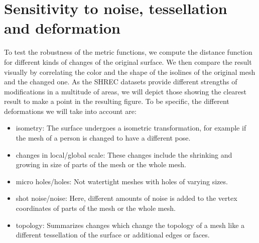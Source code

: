 \section{Sensitivity to noise, tessellation and deformation}
To test the robustness of the metric functions, we compute the distance function for different kinds of changes of the original surface.
We then compare the result visually by correlating the color and the shape of the isolines of the original mesh and the changed one.
As the SHREC datasets provide different strengths of modifications in a multitude of areas, we will depict those showing the clearest result to make a point in the resulting figure.
To be specific, the different deformations we will take into account are:
\begin{itemize}
	\item isometry: The surface undergoes a isometric transformation, for example if the mesh of a person is changed to have a different pose.
	\item changes in local/global scale: These changes include the shrinking and growing in size of parts of the mesh or the whole mesh.
	\item micro holes/holes: Not watertight meshes with holes of varying sizes.
	\item shot noise/noise: Here, different amounts of noise is added to the vertex coordinates of parts of the mesh or the whole mesh.
	\item topology: Summarizes changes which change the topology of a mesh like a different tessellation of the surface or  additional edges or faces.
\end{itemize}

